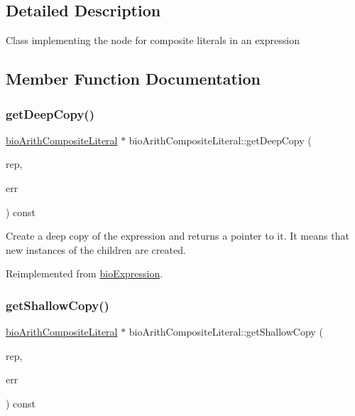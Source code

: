 \subsection{Detailed Description}
Class implementing the node for composite literals in an expression 

\subsection{Member Function Documentation}
\mbox{\label{classbio_arith_composite_literal_aff5a7801055d4691dcc1ee84cc9fa201}} 
\subsubsection{\texorpdfstring{get\+Deep\+Copy()}{getDeepCopy()}}
{\footnotesize\ttfamily \hyperlink{classbio_arith_composite_literal}{bio\+Arith\+Composite\+Literal} $\ast$ bio\+Arith\+Composite\+Literal\+::get\+Deep\+Copy (\begin{DoxyParamCaption}\item[{\hyperlink{classbio_expression_repository}{bio\+Expression\+Repository} $\ast$}]{rep,  }\item[{pat\+Error $\ast$\&}]{err }\end{DoxyParamCaption}) const\hspace{0.3cm}{\ttfamily [virtual]}}

Create a deep copy of the expression and returns a pointer to it. It means that new instances of the children are created. 

Reimplemented from \hyperlink{classbio_expression_a4ee1b8add634078a02eaae26cd40dcc8}{bio\+Expression}.

\mbox{\label{classbio_arith_composite_literal_a99216fa86facca3b310a985c69116136}} 
\subsubsection{\texorpdfstring{get\+Shallow\+Copy()}{getShallowCopy()}}
{\footnotesize\ttfamily \hyperlink{classbio_arith_composite_literal}{bio\+Arith\+Composite\+Literal} $\ast$ bio\+Arith\+Composite\+Literal\+::get\+Shallow\+Copy (\begin{DoxyParamCaption}\item[{\hyperlink{classbio_expression_repository}{bio\+Expression\+Repository} $\ast$}]{rep,  }\item[{pat\+Error $\ast$\&}]{err }\end{DoxyParamCaption}) const\hspace{0.3cm}{\ttfamily [virtual]}}

